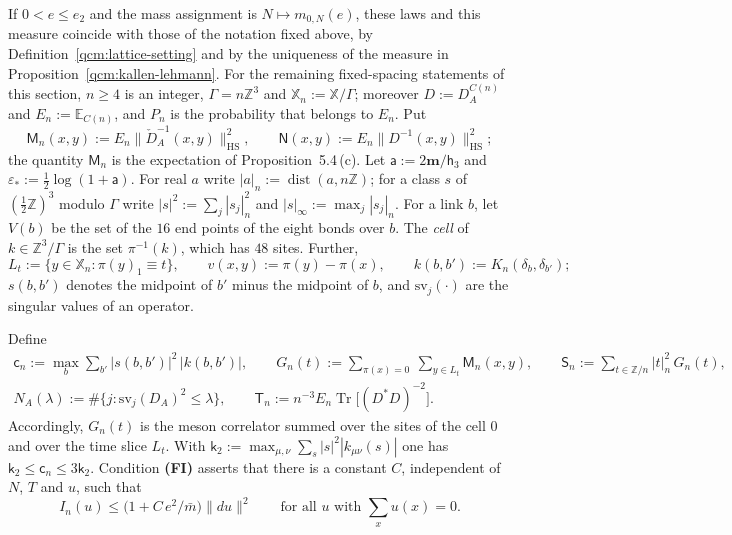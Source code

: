 \documentclass[11pt,letterpaper,reqno]{amsart}
\theoremstyle{definition}
\begin{document}
If $0<e\le e_2$ and the mass assignment is $N\mapsto m_{0,N}(e)$, these laws and this measure coincide with those of the notation fixed above, by Definition~\ref{qcm:lattice-setting} and by the uniqueness of the measure in Proposition~\ref{qcm:kallen-lehmann}.
For the remaining fixed-spacing statements of this section, $n\ge4$ is an integer, $\Gamma=n\mathbb Z^3$ and $\mathbb X_n:=\mathbb X/\Gamma$; moreover $D:=D^{C(n)}_A$ and $E_n:=\mathbb E_{C(n)}$, and $P_n$ is the probability that belongs to $E_n$.
Put
\begin{equation*}
\mathsf M_n(x,y):=E_n\|\check D_A^{-1}(x,y)\|^2_{\mathrm{HS}},\qquad\mathsf N(x,y):=E_n\|D^{-1}(x,y)\|^2_{\mathrm{HS}};
\end{equation*}
the quantity $\mathsf M_n$ is the expectation of Proposition~5.4\,(c).
Let $\mathsf a:=2\mathbf m/\mathsf h_3$ and $\varepsilon_*:=\frac12\log(1+\mathsf a)$.
For real $a$ write $|a|_n:=\operatorname{dist}(a,n\mathbb Z)$; for a class $s$ of $(\frac12\mathbb Z)^3$ modulo $\Gamma$ write $|s|^2:=\sum_j|s_j|_n^2$ and $|s|_\infty:=\max_j|s_j|_n$.
For a link $b$, let $V(b)$ be the set of the $16$ end points of the eight bonds over $b$.
The \emph{cell} of $k\in\mathbb Z^3/\Gamma$ is the set $\pi^{-1}(k)$, which has $48$ sites.
Further,
\begin{equation*}
L_t:=\{y\in\mathbb X_n:\pi(y)_1\equiv t\},\qquad v(x,y):=\pi(y)-\pi(x),\qquad k(b,b'):=K_n(\delta_b,\delta_{b'});
\end{equation*}
$s(b,b')$ denotes the midpoint of $b'$ minus the midpoint of $b$, and $\mathrm{sv}_j(\cdot)$ are the singular values of an operator.

Define
\begin{gather*}
\mathsf c_n:=\max_b\sum_{b'}|s(b,b')|^2\,|k(b,b')|,\qquad G_n(t):=\sum_{\pi(x)=0}\ \sum_{y\in L_t}\mathsf M_n(x,y),\qquad\mathsf S_n:=\sum_{t\in\mathbb Z/n}|t|_n^2\,G_n(t),\\
N_A(\lambda):=\#\{j:\mathrm{sv}_j(D_A)^2\le\lambda\},\qquad\mathsf T_n:=n^{-3}E_n\operatorname{Tr}\bigl[(D^*D)^{-2}\bigr].
\end{gather*}
Accordingly, $G_n(t)$ is the meson correlator summed over the sites of the cell $0$ and over the time slice $L_t$.
With $\mathsf k_2:=\max_{\mu,\nu}\sum_s|s|^2|k_{\mu\nu}(s)|$ one has $\mathsf k_2\le\mathsf c_n\le3\mathsf k_2$.
Condition \textbf{(FI)} asserts that there is a constant $C$, independent of $N$, $T$ and $u$, such that
\begin{equation*}
I_n(u)\le\bigl(1+C\,e^2/\bar m\bigr)\|du\|^2\qquad\text{for all $u$ with $\sum_xu(x)=0$.}
\end{equation*}
\end{document}
